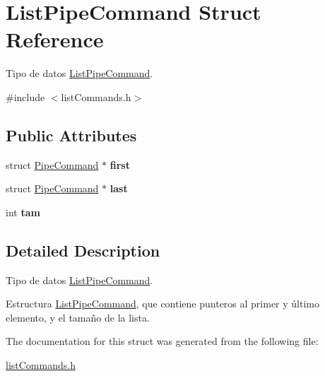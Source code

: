 \hypertarget{structListPipeCommand}{\section{List\-Pipe\-Command Struct Reference}
\label{structListPipeCommand}
}


Tipo de datos \hyperlink{structListPipeCommand}{List\-Pipe\-Command}.  




{\ttfamily \#include $<$list\-Commands.\-h$>$}

\subsection*{Public Attributes}
\begin{DoxyCompactItemize}
\item 
\hypertarget{structListPipeCommand_a7fb4c1eecf5de49159d61734495536b6}{struct \hyperlink{structPipeCommand}{Pipe\-Command} $\ast$ {\bfseries first}}\label{structListPipeCommand_a7fb4c1eecf5de49159d61734495536b6}

\item 
\hypertarget{structListPipeCommand_ab5eb3bfbb69d12e194155dd877d1dad4}{struct \hyperlink{structPipeCommand}{Pipe\-Command} $\ast$ {\bfseries last}}\label{structListPipeCommand_ab5eb3bfbb69d12e194155dd877d1dad4}

\item 
\hypertarget{structListPipeCommand_a54d6d36ebf9e024d1fccb32fcab30aef}{int {\bfseries tam}}\label{structListPipeCommand_a54d6d36ebf9e024d1fccb32fcab30aef}

\end{DoxyCompactItemize}


\subsection{Detailed Description}
Tipo de datos \hyperlink{structListPipeCommand}{List\-Pipe\-Command}. 

Estructura \hyperlink{structListPipeCommand}{List\-Pipe\-Command}, que contiene punteros al primer y último elemento, y el tamaño de la lista. 

The documentation for this struct was generated from the following file\-:\begin{DoxyCompactItemize}
\item 
\hyperlink{listCommands_8h}{list\-Commands.\-h}\end{DoxyCompactItemize}
